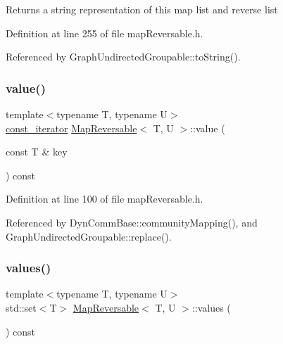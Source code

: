 \begin{DoxyReturn}{Returns}
a string representation of this map list and reverse list 
\end{DoxyReturn}


Definition at line 255 of file map\+Reversable.\+h.



Referenced by Graph\+Undirected\+Groupable\+::to\+String().

\mbox{\label{classMapReversable_ad4b84d263ee939c25f45a0503f3b3c21}} 
\subsubsection{\texorpdfstring{value()}{value()}}
{\footnotesize\ttfamily template$<$typename T, typename U$>$ \\
\hyperlink{classMapReversable_a7a41e7d60ba284a59e7bf76c8c53e9c2}{const\+\_\+iterator} \hyperlink{classMapReversable}{Map\+Reversable}$<$ T, U $>$\+::value (\begin{DoxyParamCaption}\item[{const T \&}]{key }\end{DoxyParamCaption}) const\hspace{0.3cm}{\ttfamily [inline]}}



Definition at line 100 of file map\+Reversable.\+h.



Referenced by Dyn\+Comm\+Base\+::community\+Mapping(), and Graph\+Undirected\+Groupable\+::replace().

\mbox{\label{classMapReversable_a3c56d581fed9f1e05b5b6db86858ac6b}} 
\subsubsection{\texorpdfstring{values()}{values()}}
{\footnotesize\ttfamily template$<$typename T, typename U$>$ \\
std\+::set$<$T$>$ \hyperlink{classMapReversable}{Map\+Reversable}$<$ T, U $>$\+::values (\begin{DoxyParamCaption}{ }\end{DoxyParamCaption}) const\hspace{0.3cm}{\ttfamily [inline]}}

